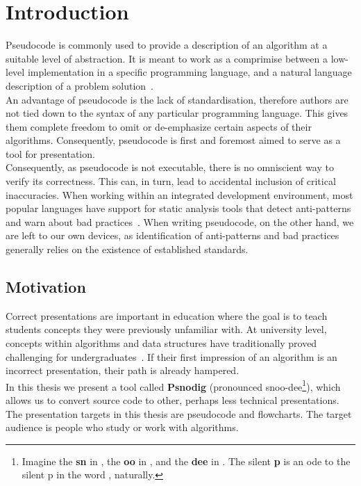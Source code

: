 \chapter{Introduction}

Pseudocode is commonly used to provide a description of an algorithm at a suitable level of abstraction. It is meant to work as a comprimise between a low-level implementation in a specific programming language, and a natural language description of a problem solution~\cite{whatIsPseudocode}. \\

An advantage of pseudocode is the lack of standardisation, therefore authors are not tied down to the syntax of any particular programming language. This gives them complete freedom to omit or de-emphasize certain aspects of their algorithms. Consequently, pseudocode is first and foremost aimed to serve as a tool for presentation. \\

Consequently, as pseudocode is not executable, there is no omniscient way to verify its correctness. This can, in turn, lead to accidental inclusion of critical inaccuracies. When working within an integrated development environment, most popular languages have support for static analysis tools that detect anti-patterns and warn about bad practices~\cite{manyLinters, whatIsALinter}. 
When writing pseudocode, on the other hand, we are left to our own devices, as identification of anti-patterns and bad practices generally relies on the existence of established standards. \\

\section{Motivation}

Correct presentations are important in education where the goal is to teach students concepts they were previously unfamiliar with. At university level, concepts within algorithms and data structures have traditionally proved challenging for undergraduates~\cite{algorithmsAreHard1, algorithmsAreHard2, algorithmsAreHard3}. If their first impression of an algorithm is an incorrect presentation, their path is already hampered. \\

In this thesis we present a tool called \textbf{Psnodig} (pronounced snoo-dee\footnote{Imagine the \textbf{sn} in , the \textbf{oo} in , and the \textbf{dee} in . The silent \textbf{p} is an ode to the silent p in the word , naturally.}), which allows us to convert source code to other, perhaps less technical presentations. The presentation targets in this thesis are pseudocode and flowcharts. The target audience is people who study or work with algorithms. \\

